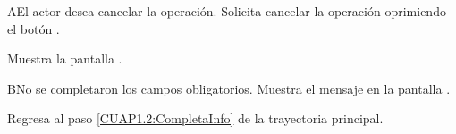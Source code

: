 \begin{UCtrayectoriaA}{A}{El actor desea cancelar la operación.}
	\UCpaso [\UCactor] Solicita cancelar la operación oprimiendo el botón .
	
	\UCpaso [\UCsist] Muestra la pantalla . 
\end{UCtrayectoriaA}

\begin{UCtrayectoriaA}{B}{No se completaron los campos obligatorios.}
	\UCpaso [\UCsist] Muestra el mensaje  en la pantalla .
	
	\UCpaso Regresa al paso \ref{CUAP1.2:CompletaInfo} de la trayectoria principal.
\end{UCtrayectoriaA}

